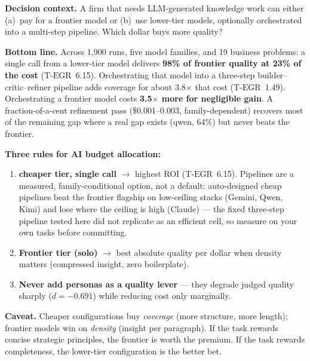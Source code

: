 \documentclass[12pt,a4paper]{article}
\newcommand{\TEGR}{\ensuremath{\text{T-EGR}}}
\begin{document}
\begin{mdframed}[style=execsummary]
\noindent\textbf{Decision context.} A firm that needs LLM-generated knowledge
work can either (a)~pay for a frontier model or (b)~use lower-tier models,
optionally orchestrated into a multi-step pipeline. Which dollar buys more
quality?

\medskip
\noindent\textbf{Bottom line.} Across 1{,}900 runs, five model families, and 19
business problems: a single call from a lower-tier model delivers
\textbf{98\% of frontier quality at 23\% of the cost} ($\TEGR$~6.15).
Orchestrating that model into a three-step builder--critic--refiner pipeline
adds coverage for about 3.8$\times$ that cost ($\TEGR$~1.49). Orchestrating a
frontier model costs \textbf{3.5$\times$ more for negligible gain}. A
fraction-of-a-cent refinement pass (\$0.001--0.003, family-dependent)
recovers most of the remaining gap where a real gap exists
(qwen, 64\%) but never beats the frontier.

\medskip
\noindent\textbf{Three rules for AI budget allocation:}
\begin{enumerate}[leftmargin=*,nosep]
  \item \textbf{cheaper tier, single call} $\to$ highest ROI
    ($\TEGR$~6.15). Pipelines are a measured, family-conditional option, not a
    default: auto-designed cheap pipelines beat the frontier flagship on
    low-ceiling stacks (Gemini, Qwen, Kimi) and lose where the ceiling is high
    (Claude) --- the fixed three-step pipeline tested here did not replicate
    as an efficient cell, so measure on your own tasks before committing.
  \item \textbf{Frontier tier (solo)} $\to$ best absolute quality per dollar
    when density matters (compressed insight, zero boilerplate).
  \item \textbf{Never add personas as a quality lever} --- they degrade judged
    quality sharply ($d = -0.691$) while reducing cost only marginally.
\end{enumerate}

\medskip
\noindent\textbf{Caveat.} Cheaper configurations buy \emph{coverage} (more
structure, more length); frontier models win on \emph{density} (insight per
paragraph). If the task rewards concise strategic principles, the frontier is
worth the premium. If the task rewards completeness, the lower-tier
configuration is the better bet.
\end{mdframed}
\end{document}
